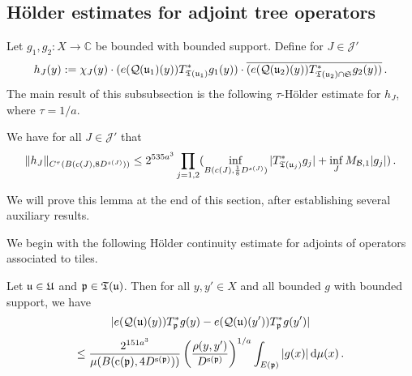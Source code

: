 \subsection{H\"older estimates for adjoint tree operators}
\label{subsubsec-holder-estimates}
    Let $g_1, g_2:X \to \mathbb{C}$ be bounded with bounded support.
    Define for $J \in \mathcal{J}'$
    \begin{equation}
        \label{def-hj}
        h_J(y) := \chi_J(y)\cdot(e({\mathcal{Q}}({\mathfrak u}_1)(y)) T_{{\mathfrak T}({\mathfrak u}_1)}^* g_1(y)) \cdot \overline{(e({\mathcal{Q}}({\mathfrak u}_2)(y)) T_{{\mathfrak T}({\mathfrak u}_2) \cap \mathfrak{S}}^* g_2(y))}\,.
    \end{equation}
    The main result of this subsubsection is the following $\tau$-H\"older estimate for $h_J$, where $\tau = 1/a$.

    \begin{lemma}
        \label{Holder-correlation-tree}
        \leanok
        We have for all $J \in \mathcal{J}'$ that
      \begin{equation}
            \label{hHolder}
            \|h_J\|_{C^{\tau}(B(c(J), 8D^{s(J)}))} \le 2^{535a^3} \prod_{j = 1,2} (\inf_{B(c(J), \frac{1}{8}D^{s(J)})} |T_{{\mathfrak T}({\mathfrak u}_j)}^* g_j| + \inf_J M_{\mathcal{B}, 1} |g_j|)\,.
        \end{equation}
    \end{lemma}

    We will prove this lemma at the end of this section, after establishing several auxiliary results.

    We begin with the following H\"older continuity estimate for adjoints of operators associated to tiles.
    \begin{lemma}
        \label{Holder-correlation-tile}
        \leanok
        Let ${\mathfrak u} \in {\mathfrak U}$ and ${\mathfrak p} \in {\mathfrak T}({\mathfrak u})$. Then for all $y, y' \in X$ and all bounded $g$ with bounded support, we have
        $$
            |e({\mathcal{Q}}({\mathfrak u})(y)) T_{{\mathfrak p}}^* g(y) - e({\mathcal{Q}}({\mathfrak u})(y')) T_{{\mathfrak p}}^* g(y')|
        $$
      \begin{equation}
            \label{T*Holder2}
            \le \frac{2^{151a^3}}{\mu(B({\mathrm{c}}({\mathfrak p}), 4D^{{\mathrm{s}}({\mathfrak p})}))} \left(\frac{\rho(y, y')}{D^{{\mathrm{s}}({\mathfrak p})}}\right)^{1/a} \int_{E({\mathfrak p})} |g(x)| \, \mathrm{d}\mu(x)\,.
        \end{equation}
    \end{lemma}


